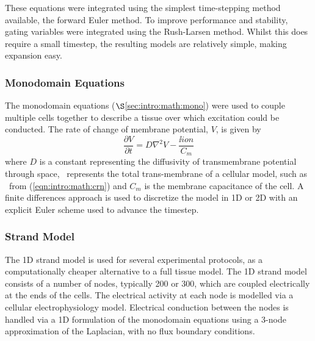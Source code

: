 These equations were integrated using the simplest time-stepping method
available, the forward Euler method.
To improve performance and stability, gating variables were integrated using the
Rush-Larsen method.
Whilst this does require a small timestep, the resulting models are relatively
simple, making expansion easy.


\subsubsection{Monodomain Equations}

The monodomain equations ($\S$\ref{sec:intro:math:mono}) were used to couple multiple cells together to describe
a tissue over which excitation could be conducted.
The rate of change of membrane potential, $V$, is given by
\begin{equation}
\label{eqn:toolkit:monodomain}
\frac{\partial V}{\partial t} = D \nabla^{2} V - \frac{\ii{ion}}{C_{m}}
\end{equation}
where $D$ is a constant representing the diffusivity of transmembrane potential through
space, \ represents the total trans-membrane of a cellular model, such
as \ from (\ref{eqn:intro:math:crn}) and $C_{m}$ is the membrane capacitance
of the cell.
A finite differences approach is used to discretize the model in 1D or 2D with
an explicit Euler scheme used to advance the timestep.

\subsubsection{Strand Model}

% 

The 1D strand model is used for several experimental protocols, as
a computationally cheaper alternative to a full tissue model.
The 1D strand model consists of a number of nodes, typically 200 or 300, which
are coupled electrically at the ends of the cells.
The electrical activity at each node is modelled via a cellular
electrophysiology model.
Electrical conduction between the nodes is handled via a 1D formulation of the
monodomain equations using a 3-node approximation of the Laplacian, with no
flux boundary conditions.



